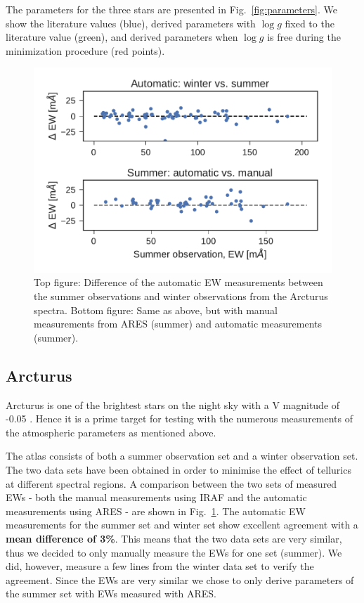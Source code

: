 \documentclass{aa}
\begin{document}
The parameters for the three stars are presented in Fig.~\ref{fig:parameters}. We show the
literature values (blue), derived parameters with $\log g$ fixed to the literature value (green),
and derived parameters when $\log g$ is free during the minimization procedure (red points).

\begin{figure}[htpb!]
    \centering
    \includegraphics[width=1.0\linewidth]{figures/EWcomp.pdf}
    \caption{Top figure: Difference of the automatic EW measurements between the
             summer observations and winter observations from the Arcturus
             spectra. Bottom figure: Same as above, but with manual measurements
             from ARES (summer) and automatic measurements (summer).}
    \label{fig:EWcomp}
\end{figure}


\subsection{Arcturus}
\label{sec:arcturus}

Arcturus is one of the brightest stars on the night sky with a V magnitude of
-0.05 \citep{Ducati2002}. Hence it is a prime target for testing with the
numerous measurements of the atmospheric parameters as mentioned above.

The atlas consists of both a summer observation set and a winter observation
set. The two data sets have been obtained in order to minimise the effect of
tellurics at different spectral regions. A comparison between the two sets of
measured EWs - both the manual measurements using IRAF and the automatic
measurements using ARES - are shown in Fig.~\ref{fig:EWcomp}. The automatic EW
measurements for the summer set and winter set show excellent agreement
with a {\bf mean difference of 3\%}. This means that the two data sets are very
similar, thus we decided to only manually measure the EWs for one set (summer).
We did, however, measure a few lines from the winter data set to verify the
agreement. Since the EWs are very similar we chose to only derive
parameters of the summer set with EWs measured with ARES.
\end{document}
